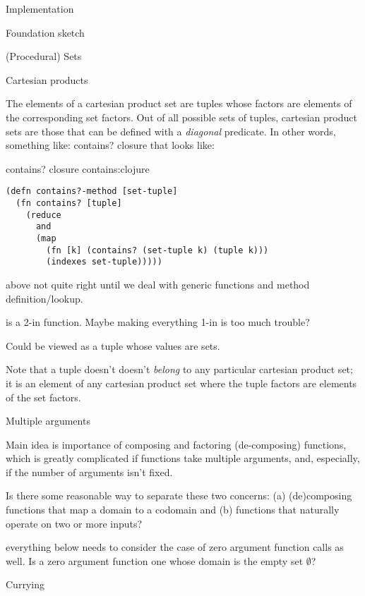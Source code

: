 \documentclass[12pt]{PalisadesLakesBook}
\begin{document}
\begin{plSection}{Implementation}
\begin{plSection}{Foundation sketch}
\begin{plSection}{(Procedural) Sets}
\begin{plSection}{Cartesian products} 

The elements of a cartesian product set are tuples
whose factors are elements of the corresponding set factors.
Out of all possible sets of tuples, cartesian product sets
are those that can be defined with a \emph{diagonal} predicate.
In other words, something like:
{\pseudocodeFont contains?} closure that looks like: 
\begin{plListing}
{{\pseudocodeFont contains?} closure}
{contains:clojure}
\begin{lstlisting}[language=pseudocode]
(defn contains?-method [set-tuple]
  (fn contains? [tuple]
    (reduce 
      and 
      (map 
        (fn [k] (contains? (set-tuple k) (tuple k)))
        (indexes set-tuple)))))
\end{lstlisting}
\end{plListing}
\TODO above not quite right until we deal with generic functions
and method definition/lookup. 

 is a 2-in function.
Maybe making everything 1-in is too much trouble?

Could be viewed as a tuple whose values are sets.

Note that a tuple doesn't doesn't \emph{belong} to any
particular cartesian product set; 
it is an element of any cartesian product set 
where the tuple factors are elements of the set factors.

\end{plSection}%

\end{plSection}%
\begin{plSection}{Multiple arguments}

Main idea is importance of composing and factoring (de-composing)
functions, which is greatly complicated 
if functions take multiple arguments,
and, especially, if the number of arguments isn't fixed. 

Is there some reasonable way to separate these two concerns:
(a) (de)composing functions that map a domain to a codomain
and 
(b) functions that naturally operate on two or more inputs?

\TODO everything below needs to consider the case of zero
argument function calls as well. 
Is a zero argument function one whose domain is the empty set
$\emptyset$?
\begin{plSection}{Currying}


\end{plSection}
\end{plSection}
\end{plSection}
\end{plSection}
\end{document}
